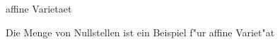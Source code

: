 \documentclass[class=article, crop=false]{standalone}
\begin{document}
\begin{zettel}{affine Varietaet}
\begin{flashcard}[]{}
	\begin{definition}
		Die Menge von Nullstellen ist ein Beispiel f"ur affine Variet"at
	\end{definition}
\end{flashcard}
\end{zettel}
\end{document}
